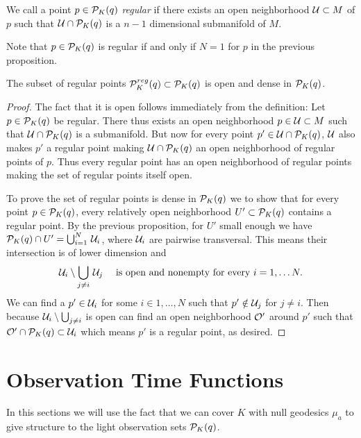 \begin{definition}\label{def:regpt}
We call a point $p\in {\mathcal{P}}_K(q)$ \emph{regular} if there exists an open neighborhood ${\mathcal{U}}\subset M$ of $p$ such that ${\mathcal{U}}\cap {\mathcal{P}}_K(q)$ is a $n-1$ dimensional submanifold of $M$.

Note that $p\in {\mathcal{P}}_K(q)$ is regular if and only if $N=1$ for $p$ in the previous proposition.
\end{definition}


\begin{corollary}\label{cor:opendense}
    The subset of regular points ${\mathcal{P}}^{reg}_K(q)\subset {\mathcal{P}}_K(q)$ is open and dense in ${\mathcal{P}}_K(q)$.
\end{corollary}
\begin{proof}
The fact that it is open follows immediately from the definition: Let $p\in {\mathcal{P}}_K(q)$ be regular. There thus exists an open neighborhood $p\in {\mathcal{U}}\subset M$ such that $\mathcal{U} \cap {\mathcal{P}}_K(q)$ is a submanifold. But now for every point $p'\in \mathcal{U}\cap{\mathcal{P}}_K(q)$, ${\mathcal{U}}$ also makes $p'$ a regular point making $\mathcal{U}\cap{\mathcal{P}}_K(q)$ an open neighborhood of regular points of $p$. Thus every regular point has an open neighborhood of regular points making the set of regular points itself open.

To prove the set of regular points is dense in ${{\mathcal{P}}_K(q)}$ we to show that for every point $p\in {\mathcal{P}}_K(q)$, every relatively open neighborhood $U'\subset{\mathcal{P}}_K(q)$ contains a regular point. By the previous proposition, for $U'$ small enough we have ${\mathcal{P}}_K(q)\cap U' = \bigcup_{i=1}^N\,\mathcal{U}_i$, where $\mathcal{U}_i$ are pairwise transversal. This means their intersection is of lower dimension and 
\[
    \mathcal{U}_i \setminus \bigcup_{j\neq i}\, \mathcal{U}_j \quad \text{ is open and nonempty for every }i=1,\dots N.
\]
We can find a $p'\in {\mathcal{U}}_i$ for some $i\in 1,\dots,N$ such that $p'\notin {\mathcal{U}}_j$ for $j\neq i$. Then because $\mathcal{U}_i \setminus \bigcup_{j\neq i}$ is open can find an open neighborhood ${\mathcal{O}}'$ around $p'$ such that ${\mathcal{O}}'\cap {\mathcal{P}}_K(q)\subset {\mathcal{U}}_i$ which means $p'$ is a regular point, as desired.
\end{proof}

\section{Observation Time Functions}
In this sections we will use the fact that we can cover $K$ with null geodesics $\mu_a$ to give structure to the light observation sets ${\mathcal{P}}_K(q)$.

